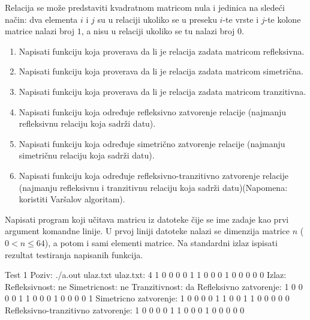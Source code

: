 \begin{Exercise}[label=322]
Relacija se može predstaviti kvadratnom matricom nula i
jedinica na sledeći način: dva elementa $i$ i $j$
su u relaciji ukoliko se u preseku $i$-te vrste i $j$-te
kolone matrice nalazi broj $1$, a nisu u relaciji ukoliko se
tu nalazi broj $0$. 
\begin{enumerate}
\item Napisati funkciju koja proverava da li je relacija zadata matricom refleksivna.
\item Napisati funkciju koja proverava da li je relacija zadata matricom simetrična.
\item Napisati funkciju koja proverava da li je relacija zadata matricom tranzitivna.
\item Napisati funkciju koja određuje refleksivno zatvorenje relacije (najmanju refleksivnu relaciju koja sadrži datu).
\item Napisati funkciju koja određuje simetrično zatvorenje relacije (najmanju simetričnu relaciju koja sadrži datu).
\item Napisati funkciju koja određuje refleksivno-tranzitivno zatvorenje relacije (najmanju refleksivnu i tranzitivnu relaciju
koja sadrži datu)(Napomena: koristiti Varšalov algoritam).
\end{enumerate}
Napisati program koji učitava matricu iz datoteke čije se ime zadaje kao prvi argument komandne linije.
U prvoj liniji datoteke nalazi se dimenzija matrice $n$ ($0 < n \leq 64$), a potom i sami elementi matrice.
Na standardni izlaz ispisati rezultat testiranja napisanih funkcija.

\begin{maxitest}
\begin{test}{Test 1}
Poziv: ./a.out ulaz.txt
ulaz.txt:  4
           1 0 0 0
           0 1 1 0
           0 0 1 0
           0 0 0 0
Izlaz:     Refleksivnost: ne
           Simetricnost: ne
           Tranzitivnost: da
           Refleksivno zatvorenje:
           1 0 0 0
           0 1 1 0
           0 0 1 0
           0 0 0 1
           Simetricno zatvorenje:
           1 0 0 0
           0 1 1 0
           0 1 1 0
           0 0 0 0
           Refleksivno-tranzitivno zatvorenje:
           1 0 0 0
           0 1 1 0
           0 0 1 0
           0 0 0 0
\end{test}
\end{maxitest}
\end{Exercise}
\begin{Answer}[ref=322]
\end{Answer}

